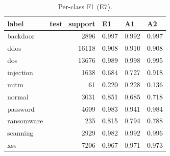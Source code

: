 \begin{table}[htbp]
\centering
\caption{Per-class F1 (E7).}
\label{Tab_R_PerClass}
\footnotesize
\begin{tabular}{lrlll}
\toprule
label & test\_support & E1 & A1 & A2 \\
\midrule
backdoor & 2896 & 0.997 & 0.992 & 0.997 \\
ddos & 16118 & 0.908 & 0.910 & 0.908 \\
dos & 13676 & 0.989 & 0.998 & 0.995 \\
injection & 1638 & 0.684 & 0.727 & 0.918 \\
mitm & 61 & 0.220 & 0.228 & 0.136 \\
normal & 3031 & 0.851 & 0.685 & 0.718 \\
password & 4609 & 0.983 & 0.941 & 0.984 \\
ransomware & 235 & 0.815 & 0.794 & 0.788 \\
scanning & 2929 & 0.982 & 0.992 & 0.996 \\
xss & 7206 & 0.967 & 0.971 & 0.973 \\
\bottomrule
\end{tabular}
\end{table}

